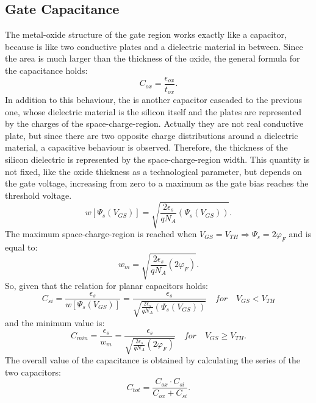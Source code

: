 \documentclass[11pt,a4paper]{article}
\begin{document}
	\subsection{Gate Capacitance}
	The metal-oxide structure of the gate region works exactly like a capacitor, because is like two conductive plates and a dielectric material in between. Since the area is much larger than the thickness of the oxide, the general formula for the capacitance holds: 
	\begin{equation}\label{cox}
		C_{ox} = \frac{\epsilon_{ox}}{t_{ox}}. 
	\end{equation} In addition to this behaviour, the is another capacitor cascaded to the previous one, whose dielectric material is the silicon itself and the plates are represented by the charges of the space-charge-region. Actually they are not real conductive plate, but since there are two opposite charge distributions around a dielectric material, a capacitive behaviour is observed. Therefore, the thickness of the silicon dielectric is represented by the space-charge-region width. This quantity is not fixed, like the oxide thickness as a technological parameter, but depends on the gate voltage, increasing from zero to a maximum as the gate bias reaches the threshold voltage.
	\begin{equation}\label{scr}
		w[\Psi_s(V_{GS})] = \sqrt{\frac{2\epsilon_s}{qN_A}\left(\Psi_s(V_{GS})\right)}.
	\end{equation}  
	The maximum space-charge-region is reached when $V_{GS} = V_{TH} \Rightarrow \Psi_s = 2\varphi_F$ and is equal to:
	\begin{equation}\label{scr}
	w_m = \sqrt{\frac{2\epsilon_s}{qN_A}(2\varphi_F)}.
	\end{equation} 
	So, given that the relation for planar capacitors holds:
	\begin{equation}
		C_{si} = \frac{\epsilon_s}{w[\Psi_s(V_{GS})]} = \frac{\epsilon_s}{\sqrt{\frac{2\epsilon_s}{qN_A}\left(\Psi_s(V_{GS})\right)}} \quad for \quad  V_{GS}<V_{TH}
	\end{equation} and the minimum value is:
	\begin{equation} \label{cmin}
		C_{min} = \frac{\epsilon_s}{w_m} = \frac{\epsilon_s}{\sqrt{\frac{2\epsilon_s}{qN_A}\left(2\varphi_F\right)}} \quad for \quad  V_{GS}\geq V_{TH}.
	\end{equation}
	The overall value of the capacitance is obtained by calculating the series of the two capacitors:
	\begin{equation}
		C_{tot} = \frac{C_{ox} \cdot C_{si}}{C_{ox}+C_{si}}.
	\end{equation} 
\end{document}
